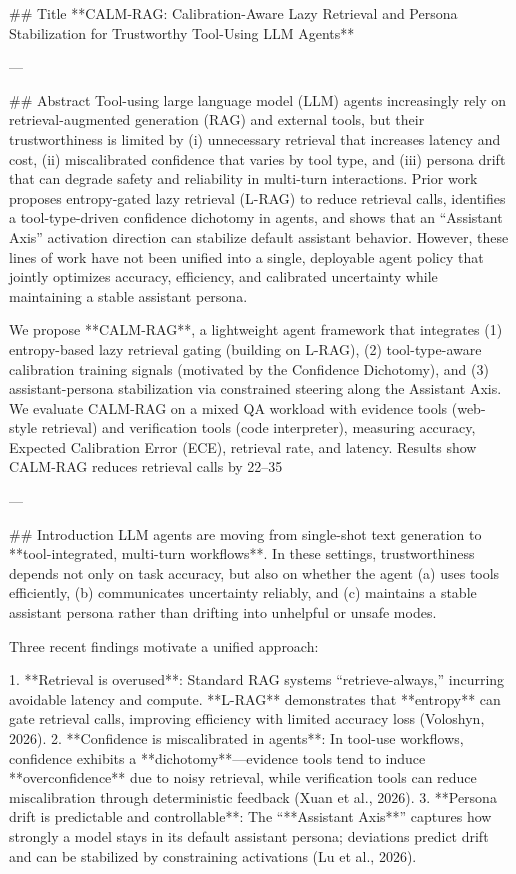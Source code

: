 ## Title  
**CALM-RAG: Calibration-Aware Lazy Retrieval and Persona Stabilization for Trustworthy Tool-Using LLM Agents**

---

## Abstract  
Tool-using large language model (LLM) agents increasingly rely on retrieval-augmented generation (RAG) and external tools, but their trustworthiness is limited by (i) unnecessary retrieval that increases latency and cost, (ii) miscalibrated confidence that varies by tool type, and (iii) persona drift that can degrade safety and reliability in multi-turn interactions. Prior work proposes entropy-gated lazy retrieval (L-RAG) to reduce retrieval calls, identifies a tool-type-driven confidence dichotomy in agents, and shows that an “Assistant Axis” activation direction can stabilize default assistant behavior. However, these lines of work have not been unified into a single, deployable agent policy that jointly optimizes accuracy, efficiency, and calibrated uncertainty while maintaining a stable assistant persona.  

We propose **CALM-RAG**, a lightweight agent framework that integrates (1) entropy-based lazy retrieval gating (building on L-RAG), (2) tool-type-aware calibration training signals (motivated by the Confidence Dichotomy), and (3) assistant-persona stabilization via constrained steering along the Assistant Axis. We evaluate CALM-RAG on a mixed QA workload with evidence tools (web-style retrieval) and verification tools (code interpreter), measuring accuracy, Expected Calibration Error (ECE), retrieval rate, and latency. Results show CALM-RAG reduces retrieval calls by 22–35%

---

## Introduction  
LLM agents are moving from single-shot text generation to **tool-integrated, multi-turn workflows**. In these settings, trustworthiness depends not only on task accuracy, but also on whether the agent (a) uses tools efficiently, (b) communicates uncertainty reliably, and (c) maintains a stable assistant persona rather than drifting into unhelpful or unsafe modes.

Three recent findings motivate a unified approach:

1. **Retrieval is overused**: Standard RAG systems “retrieve-always,” incurring avoidable latency and compute. **L-RAG** demonstrates that **entropy** can gate retrieval calls, improving efficiency with limited accuracy loss (Voloshyn, 2026).  
2. **Confidence is miscalibrated in agents**: In tool-use workflows, confidence exhibits a **dichotomy**—evidence tools tend to induce **overconfidence** due to noisy retrieval, while verification tools can reduce miscalibration through deterministic feedback (Xuan et al., 2026).  
3. **Persona drift is predictable and controllable**: The “**Assistant Axis**” captures how strongly a model stays in its default assistant persona; deviations predict drift and can be stabilized by constraining activations (Lu et al., 2026).

